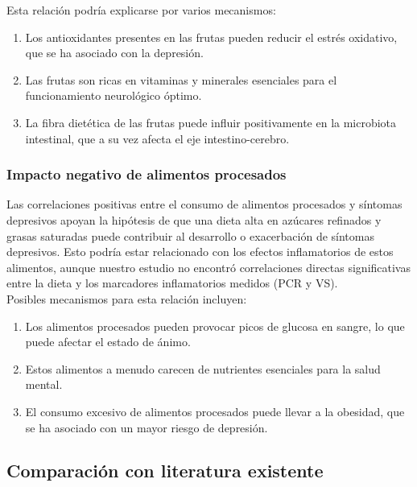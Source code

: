 \documentclass[man]{apa7}
\begin{document}
	Esta relación podría explicarse por varios mecanismos:

	\begin{enumerate}
		\item Los antioxidantes presentes en las frutas pueden reducir el estrés
		oxidativo, que se ha asociado con la depresión.\\

		\item Las frutas son ricas en vitaminas y minerales esenciales para el
		funcionamiento neurológico óptimo.\\

		\item La fibra dietética de las frutas puede influir positivamente en la
		microbiota intestinal, que a su vez afecta el eje intestino-cerebro.
	\end{enumerate}

	\subsubsection{Impacto negativo de alimentos procesados}\label{impacto-negativo-de-alimentos-procesados}

	Las correlaciones positivas entre el consumo de alimentos procesados y
	síntomas depresivos apoyan la hipótesis de que una dieta alta en
	azúcares refinados y grasas saturadas puede contribuir al desarrollo o
	exacerbación de síntomas depresivos. Esto podría estar relacionado con
	los efectos inflamatorios de estos alimentos, aunque nuestro estudio no
	encontró correlaciones directas significativas entre la dieta y los
	marcadores inflamatorios medidos (PCR y VS).\\

	Posibles mecanismos para esta relación incluyen:

	\begin{enumerate}
		\item Los alimentos procesados pueden provocar picos de glucosa en sangre, lo que puede afectar el estado de ánimo.
		\item Estos alimentos a menudo carecen de nutrientes esenciales para la salud mental.
		\item El consumo excesivo de alimentos procesados puede llevar a la obesidad, que se ha asociado con un mayor riesgo de depresión.
	\end{enumerate}


	\subsection{Comparación con literatura existente}\label{comparaciuxf3n-con-literatura-existente}
\end{document}
